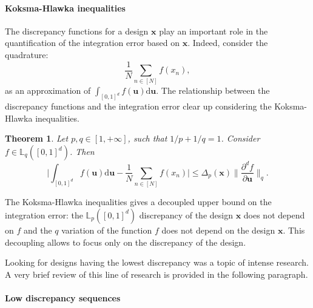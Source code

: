 \documentclass[twoside,11pt]{article}
\newtheorem{theorem}{Theorem}
\begin{document}
\paragraph{Koksma-Hlawka inequalities}
The discrepancy functions for a design $\bm{x}$ play an important role in the quantification of the integration error based on $\bm{x}$. Indeed, consider the quadrature:
\begin{equation}
\frac{1}{N} \sum\limits_{n \in [N]}  f(x_{n}),
\end{equation}
as an approximation of $\displaystyle \int_{[0,1]^{d}} f(\bm{u}) \mathrm{d}\bm{u}$. The relationship between the discrepancy functions and the integration error clear up considering the Koksma-Hlawka inequalities.

\begin{theorem}\label{thm:KH_ineq}
Let $p,q \in [1,+\infty]$, such that $1/p+1/q = 1$. Consider $f \in \mathbb{L}_{q}([0,1]^{d})$. Then 
\begin{equation}\label{eq:KH_ineq}
\bigg| \int_{[0,1]^{d}} f(\bm{u}) \mathrm{d}\bm{u} - \frac{1}{N} \sum\limits_{n \in [N]}  f(x_{n})\bigg| \leq \Delta_{p}(\bm{x}) \|\frac{\partial^{d} f}{\partial \bm{u}}\|_{q}.
\end{equation}
\end{theorem}
The Koksma-Hlawka inequalities gives a decoupled upper bound on the integration error: the $\mathbb{L}_{p}([0,1]^{d})$ discrepancy of the design $\bm{x}$ does not depend on $f$ and the $q$ variation of the function $f$ does not depend on the design $\bm{x}$. This decoupling allows to focus only on the discrepancy of the design. 

Looking for designs having the lowest discrepancy was a topic of intense research.  A very brief review of this line of research is provided in the following paragraph. 
\paragraph{Low discrepancy sequences}
\end{document}
